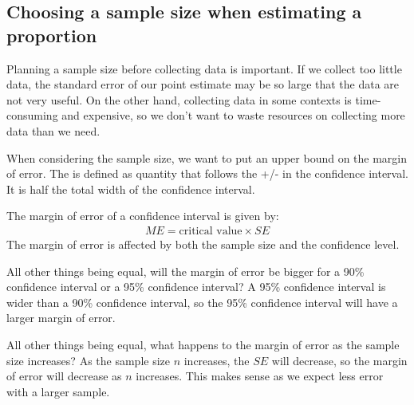 \subsection{Choosing a sample size when estimating a proportion}


Planning a sample size before collecting data is important. If we collect too little data, the standard error of our point estimate may be so large that the data are not very useful. On the other hand, collecting data in some contexts is time-consuming and expensive, so we don't want to waste resources on collecting more data than we need.

When considering the sample size, we want to put an upper bound on the margin of error. The  is defined as quantity that follows the +/- in the confidence interval. It is half the total width of the confidence interval.

\begin{termBox}{
The margin of error of a confidence interval is given by: 
\begin{align*}
ME = \text{critical value}\times SE
\end{align*}
The margin of error is affected by both the sample size and the confidence level.
}
\end{termBox}

\textA{\pagebreak}

\begin{example}{All other things being equal, will the margin of error be bigger for a 90\% confidence interval or a 95\% confidence interval?}
A 95\% confidence interval is wider than a 90\% confidence interval, so the 95\% confidence interval will have a larger margin of error.
\end{example}

\begin{example}{All other things being equal, what happens to the margin of error as the sample size increases?}
As the sample size $n$ increases, the $SE$ will decrease, so the margin of error will decrease as $n$ increases. This makes sense as we expect less error with a larger sample.
\end{example}

